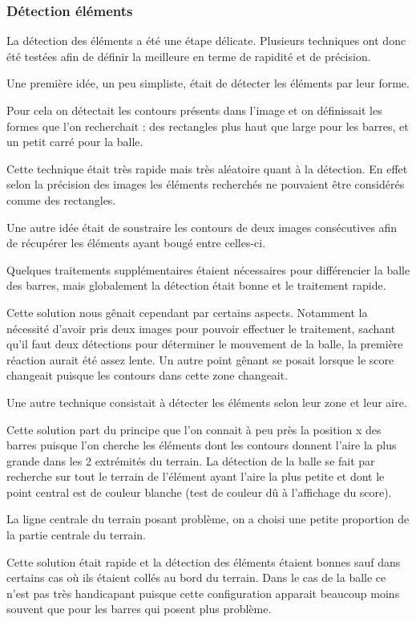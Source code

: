 \subsubsection{Détection éléments}
\label{subs:Détection éléments}
\par La détection des éléments a été une étape délicate. Plusieurs techniques ont donc été testées afin de définir la meilleure en terme de rapidité et de précision.

\par Une première idée, un peu simpliste, était de détecter les éléments par leur forme. 
\par Pour cela on détectait les contours présents dans l'image et on définissait les formes que l'on recherchait : des rectangles plus haut que large pour les barres, et un petit carré pour la balle.
\par Cette technique était très rapide mais très aléatoire quant à la détection. En effet selon la précision des images  les éléments recherchés ne pouvaient être considérés comme des rectangles.

\par Une autre idée était de soustraire les contours de deux images consécutives afin de récupérer les éléments ayant bougé entre celles-ci.
\par Quelques traitements supplémentaires étaient nécessaires pour différencier la balle des barres, mais globalement la détection était bonne et le traitement rapide.
\par Cette solution nous gênait cependant par certains aspects. Notamment la nécessité d'avoir pris deux images pour pouvoir effectuer le traitement, sachant qu'il faut deux détections pour déterminer le mouvement de la balle, la première réaction aurait été assez lente. Un autre point gênant se posait lorsque le score changeait puisque les contours dans cette zone changeait.

\par Une autre technique consistait à détecter les éléments selon leur zone et leur aire.
\par Cette solution part du principe que l'on connait à peu près la position x des barres puisque l'on cherche les éléments dont les contours donnent l'aire la plus grande dans les 2 extrémités du terrain. La détection de la balle se fait par recherche sur tout le terrain de l'élément ayant l'aire la plus petite et dont le point central est de couleur blanche (test de couleur dû à l'affichage du score).
\par La ligne centrale du terrain posant problème, on a choisi une petite proportion de la partie centrale du terrain.
\par Cette solution était rapide et la détection des éléments étaient bonnes sauf dans certains cas où ils étaient collés au bord du terrain. Dans le cas de la balle ce n'est pas très handicapant puisque cette configuration apparait beaucoup moins souvent que pour les barres qui posent plus problème.

